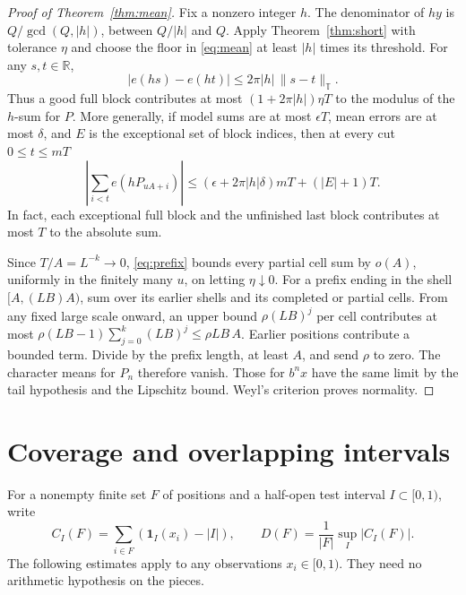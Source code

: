 \documentclass[11pt]{article}
\newcommand{\R}{\mathbb R}
\newcommand{\T}{\mathbb T}
\newcommand{\circabs}[1]{\lVert #1\rVert_{\T}}
\begin{document}
\begin{proof}[Proof of Theorem~\ref{thm:mean}]
Fix a nonzero integer \(h\). The denominator of \(hy\) is \(Q/\gcd(Q,|h|)\), between \(Q/|h|\) and \(Q\). Apply Theorem~\ref{thm:short} with tolerance \(\eta\) and choose the floor in \eqref{eq:mean} at least \(|h|\) times its threshold. For any \(s,t\in\R\),
\[
 |e(hs)-e(ht)|\le 2\pi |h|\,\circabs{s-t}.
\]
Thus a good full block contributes at most \((1+2\pi |h|)\eta T\) to the modulus of the \(h\)-sum for \(P\). More generally, if model sums are at most \(\epsilon T\), mean errors are at most \(\delta\), and \(E\) is the exceptional set of block indices, then at every cut \(0\le t\le mT\)
\begin{equation}\label{eq:prefix}
 \left|\sum_{i<t}e(h P_{uA+i})\right|
 \le(\epsilon+2\pi |h|\delta)mT+(|E|+1)T .
\end{equation}
In fact, each exceptional full block and the unfinished last block contributes at most \(T\) to the absolute sum.

Since \(T/A=L^{-k}\to0\), \eqref{eq:prefix} bounds every partial cell sum by \(o(A)\), uniformly in the finitely many \(u\), on letting \(\eta\downarrow0\). For a prefix ending in the shell \([A,(LB)A)\), sum over its earlier shells and its completed or partial cells. From any fixed large scale onward, an upper bound \(\rho (LB)^j\) per cell contributes at most \(\rho (LB-1)\sum_{j=0}^k (LB)^j\le \rho LB\,A\). Earlier positions contribute a bounded term. Divide by the prefix length, at least \(A\), and send \(\rho\) to zero. The character means for \(P_n\) therefore vanish. Those for \(b^nx\) have the same limit by the tail hypothesis and the Lipschitz bound. Weyl's criterion \cite{weyl} proves normality.
\end{proof}

\section{Coverage and overlapping intervals}\label{sec:cover}
For a nonempty finite set \(F\) of positions and a half-open test interval \(I\subset[0,1)\), write
\[
 C_I(F)=\sum_{i\in F}(\mathbf1_I(x_i)-|I|),\qquad
 D(F)=\frac{1}{|F|}\sup_I |C_I(F)|.
\]
The following estimates apply to any observations \(x_i\in[0,1)\). They need no arithmetic hypothesis on the pieces.
\end{document}
